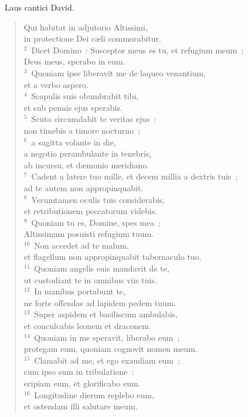~\lettrine[lines=10,image=true,loversize=0.05,lraise=-0.03]{L}{}aus cantici David. \begin{flushleft}\begin{verse}\vspace{6pt}Qui habitat in adjutorio Altissimi,\\ in protectione Dei c\ae li commorabitur.\\
${}^{2}$~Dicet Domino~: Susceptor meus es tu, et refugium meum~;\\ Deus meus, sperabo in eum.\\
${}^{3}$~Quoniam ipse liberavit me de laqueo venantium,\\ et a verbo aspero.\\
${}^{4}$~Scapulis suis obumbrabit tibi,\\ et sub pennis ejus sperabis.\\
${}^{5}$~Scuto circumdabit te veritas ejus~:\\ non timebis a timore nocturno~;\\
${}^{6}$~a sagitta volante in die,\\ a negotio perambulante in tenebris,\\ ab incursu, et d\ae monio meridiano.\\
${}^{7}$~Cadent a latere tuo mille, et decem millia a dextris tuis~;\\ ad te autem non appropinquabit.\\
${}^{8}$~Verumtamen oculis tuis considerabis,\\ et retributionem peccatorum videbis.\\
${}^{9}$~Quoniam tu es, Domine, spes mea~;\\ Altissimum posuisti refugium tuum.\\
${}^{10}$~Non accedet ad te malum,\\ et flagellum non appropinquabit tabernaculo tuo.\\
${}^{11}$~Quoniam angelis suis mandavit de te,\\ ut custodiant te in omnibus viis tuis.\\
${}^{12}$~In manibus portabunt te,\\ ne forte offendas ad lapidem pedem tuum.\\
${}^{13}$~Super aspidem et basiliscum ambulabis,\\ et conculcabis leonem et draconem.\\
${}^{14}$~Quoniam in me speravit, liberabo eum~;\\ protegam eum, quoniam cognovit nomen meum.\\
${}^{15}$~Clamabit ad me, et ego exaudiam eum~;\\ cum ipso sum in tribulatione~:\\ eripiam eum, et glorificabo eum.\\
${}^{16}$~Longitudine dierum replebo eum,\\ et ostendam illi salutare meum.\end{verse}\end{flushleft}


